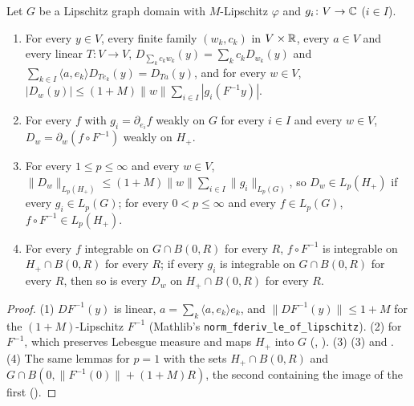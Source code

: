 \begin{lemma}
\label{lem:flat-derivative}
\leanok
{}
Let $G$ be a Lipschitz graph domain with $M$-Lipschitz $\varphi$ and $g_i \colon V \to \mathbb{C}$
($i \in I$).
\begin{enumerate}
  \item For every $y \in V$, every finite family $(w_k, c_k)$ in $V \times \mathbb{R}$, every $a \in V$
    and every linear $T \colon V \to V$,
    $D_{\sum_k c_k w_k}(y) = \sum_k c_k D_{w_k}(y)$ and
    $\sum_{k \in I} \langle a, e_k \rangle D_{T e_k}(y) = D_{T a}(y)$, and for every $w \in V$,
    $|D_w(y)| \leq (1 + M) \|w\| \sum_{i \in I} |g_i(F^{-1} y)|$.
  \item For every $f$ with $g_i = \partial_{e_i} f$ weakly on $G$ for every $i \in I$ and every
    $w \in V$, $D_w = \partial_w (f \circ F^{-1})$ weakly on $H_+$.
  \item For every $1 \leq p \leq \infty$ and every $w \in V$,
    $\|D_w\|_{L_p(H_+)} \leq (1 + M) \|w\| \sum_{i \in I} \|g_i\|_{L_p(G)}$, so $D_w \in L_p(H_+)$
    if every $g_i \in L_p(G)$; for every $0 < p \leq \infty$ and every $f \in L_p(G)$,
    $f \circ F^{-1} \in L_p(H_+)$.
  \item For every $f$ integrable on $G \cap B(0, R)$ for every $R$, $f \circ F^{-1}$ is integrable
    on $H_+ \cap B(0, R)$ for every $R$; if every $g_i$ is integrable on $G \cap B(0, R)$ for
    every $R$, then so is every $D_w$ on $H_+ \cap B(0, R)$ for every $R$.
\end{enumerate}
\end{lemma}

\begin{proof}
\leanok
(1) $DF^{-1}(y)$ is linear, $a = \sum_k \langle a, e_k \rangle e_k$, and
$\|DF^{-1}(y)\| \leq 1 + M$ for the $(1 + M)$-Lipschitz $F^{-1}$ (Mathlib's
\texttt{norm\_\allowbreak fderiv\_\allowbreak le\_\allowbreak of\_\allowbreak lipschitz}).
(2)  for $F^{-1}$, which preserves Lebesgue measure and maps
$H_+$ into $G$ (, ).
(3)  (3) and . (4) The same
lemmas for $p = 1$ with the sets
$H_+ \cap B(0, R)$ and $G \cap B(0, \|F^{-1}(0)\| + (1 + M) R)$, the second containing the
image of the first ().
\end{proof}

